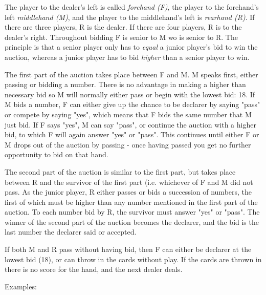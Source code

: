 \documentclass[letter]{article}
\begin{document}
  The player to the dealer's left is called \emph{forehand (F)}, the player to
  the forehand's left \emph{middlehand (M)}, and the player to the middlehand's
  left is \emph{rearhand (R)}. If there are three players, R is the dealer. If
  there are four players, R is to the dealer's right. Throughout bidding F is
  senior to M wo is senior to R. The principle is that a senior player only has
  to \emph{equal} a junior player's bid to win the auction, whereas a junior
  player has to bid \emph{higher} than a senior player to win.

  The first part of the auction takes place between F and M. M speaks first,
  either passing or bidding a number. There is no advantage in making a higher
  than necessary bid so M will normally either pass or begin with the lowest
  bid: 18. If M bids a number, F can either give up the chance to be declarer by
  saying "pass" or compete by saying "yes", which means that F bids the same
  number that M just bid. If F says "yes", M can say "pass", or continue the
  auction with a higher bid, to which F will again answer "yes" or "pass".
  This continues until either F or M drops out of the auction by passing - once
  having passed you get no further opportunity to bid on that hand. 

  The second part of the auction is similar to the first part, but takes place
  between R and the survivor of the first part (i.e. whichever of F and M did
  not pass. As the junior player, R either passes or bids a succession of
  numbers, the first of which must be higher than any number mentioned in the
  first part of the auction. To each number bid by R, the survivor must answer
  "yes" or "pass". The winner of the second part of the auction becomes the
  declarer, and the bid is the last number the declarer said or accepted.

  If both M and R pass without having bid, then F can either be declarer at the
  lowest bid (18), or can throw in the cards without play. If the cards are
  thrown in there is no score for the hand, and the next dealer deals.

  Examples:
\end{document}
